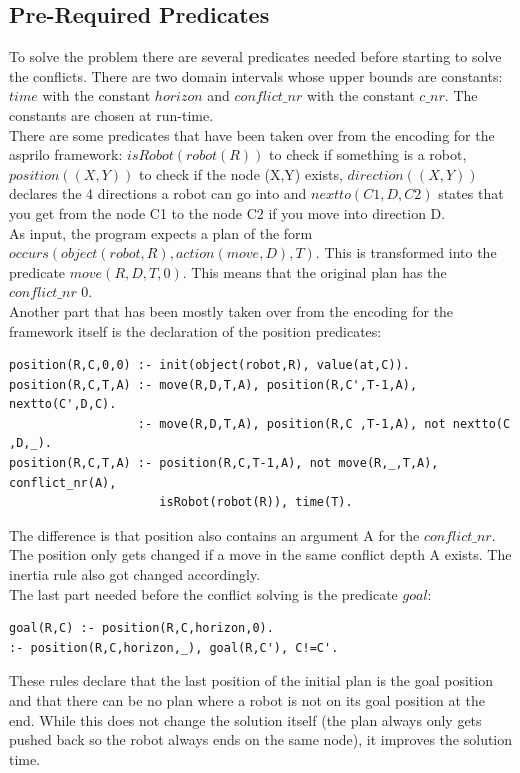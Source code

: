 \documentclass[runningheads]{llncs}
\begin{document}
\subsection{Pre-Required Predicates}
To solve the problem there are several predicates needed before starting to solve the conflicts. There are two domain intervals whose upper bounds are constants: $time$ with the constant $horizon$ and $conflict\_nr$ with the constant $c\_nr$.
The constants are chosen at run-time. \\ There are some predicates that have been taken over from the encoding for the asprilo framework: $isRobot(robot(R))$ to check if something is a robot, $position((X,Y))$ to check if the node (X,Y) exists, $direction((X,Y))$ declares the 4 directions a robot can go into and $nextto(C1,D,C2)$ states that you get from the node C1 to the node C2 if you move into direction D. \\  
As input, the program expects a plan of the form $occurs(object(robot,R),action(move,D),T)$. This is transformed into the predicate $move(R,D,T,0)$. This means that the original plan has the $conflict\_nr$ 0. \\
Another part that has been mostly taken over from the encoding for the framework itself is the declaration of the position predicates:
\begin{verbatim}
position(R,C,0,0) :- init(object(robot,R), value(at,C)).
position(R,C,T,A) :- move(R,D,T,A), position(R,C',T-1,A), nextto(C',D,C).
                  :- move(R,D,T,A), position(R,C ,T-1,A), not nextto(C ,D,_).
position(R,C,T,A) :- position(R,C,T-1,A), not move(R,_,T,A), conflict_nr(A), 
                     isRobot(robot(R)), time(T).
\end{verbatim}
The difference is that position also contains an argument A for the $conflict\_nr$. The position only gets changed if a move in the same conflict depth A exists. The inertia rule also got changed accordingly. \\
The last part needed before the conflict solving is the predicate $goal$:
\begin{verbatim}
goal(R,C) :- position(R,C,horizon,0).
:- position(R,C,horizon,_), goal(R,C'), C!=C'.
\end{verbatim}
These rules declare that the last position of the initial plan is the goal position and that there can be no plan where a robot
is not on its goal position at the end. While this does not change the solution itself (the plan always only gets pushed back so the robot always ends on the same node), it improves the solution time. \\
\end{document}
